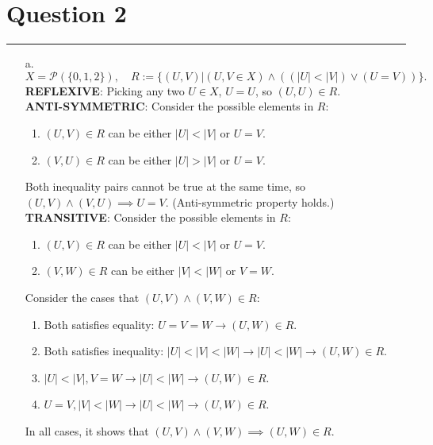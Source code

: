 \documentclass{article}
\begin{document}
\section*{Question 2}
\hrule
\vspace{0.5cm}
\begin{enumerate}
    \item [a.] $X=\mathcal{P}(\{0,1,2\}),\quad R:=\bigg\{(U,V)\bigg|(U,V\in X)\wedge((|U|<|V|)\vee(U=V))\bigg\}.$\\
          \textbf{REFLEXIVE}: Picking any two $U \in X$, $U=U$, so $(U,U) \in R$.\\
          \textbf{ANTI-SYMMETRIC}: Consider the possible elements in $R$:
          \begin{enumerate}
              \item $(U,V) \in R$ can be either $|U|<|V|$ or $U=V$.
              \item $(V,U) \in R$ can be either $|U|>|V|$ or $U=V$.
          \end{enumerate}
          Both inequality pairs cannot be true at the same time, so $(U,V) \land (V,U) \implies U=V$. (Anti-symmetric property holds.)\\
          \textbf{TRANSITIVE}: Consider the possible elements in $R$:
          \begin{enumerate}
              \item $(U,V) \in R$ can be either $|U|<|V|$ or $U=V$.
              \item $(V,W) \in R$ can be either $|V|<|W|$ or $V=W$.
          \end{enumerate}
          Consider the cases that $(U,V) \land (V,W) \in R$:
          \begin{enumerate}
              \item Both satisfies equality: $U=V=W \to (U,W) \in R$.
              \item Both satisfies inequality: $|U|<|V|<|W| \to |U| < |W| \to (U,W) \in R$.
              \item $|U|<|V|, V=W \to |U|<|W| \to (U,W) \in R$.
              \item $U=V, |V|<|W| \to |U|<|W| \to (U,W) \in R$.
          \end{enumerate}
          In all cases, it shows that $(U,V) \land (V,W) \implies (U,W) \in R$.\\



\end{enumerate}
\end{document}
